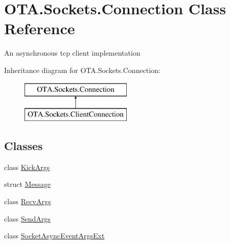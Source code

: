 \hypertarget{class_o_t_a_1_1_sockets_1_1_connection}{}\section{O\+T\+A.\+Sockets.\+Connection Class Reference}
\label{class_o_t_a_1_1_sockets_1_1_connection}


An asynchronous tcp client implementation  


Inheritance diagram for O\+T\+A.\+Sockets.\+Connection\+:\begin{figure}[H]
\begin{center}
\leavevmode
\includegraphics[height=2.000000cm]{class_o_t_a_1_1_sockets_1_1_connection}
\end{center}
\end{figure}
\subsection*{Classes}
\begin{DoxyCompactItemize}
\item 
class \hyperlink{class_o_t_a_1_1_sockets_1_1_connection_1_1_kick_args}{Kick\+Args}
\item 
struct \hyperlink{struct_o_t_a_1_1_sockets_1_1_connection_1_1_message}{Message}
\item 
class \hyperlink{class_o_t_a_1_1_sockets_1_1_connection_1_1_recv_args}{Recv\+Args}
\item 
class \hyperlink{class_o_t_a_1_1_sockets_1_1_connection_1_1_send_args}{Send\+Args}
\item 
class \hyperlink{class_o_t_a_1_1_sockets_1_1_connection_1_1_socket_async_event_args_ext}{Socket\+Async\+Event\+Args\+Ext}
\end{DoxyCompactItemize}
